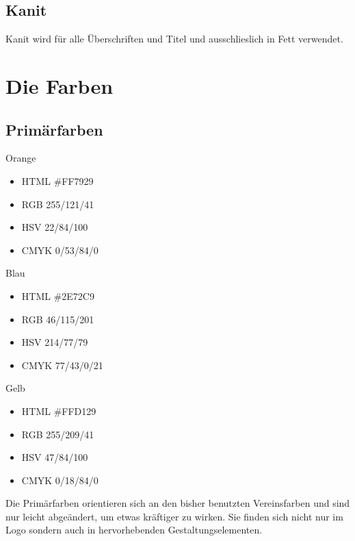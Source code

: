 \documentclass{article}
\begin{document}
\subsection{Kanit}
\begin{samepage}

Kanit wird für alle Überschriften und Titel und ausschlieslich in Fett verwendet.
\end{samepage}

\section{Die Farben}

\subsection{Primärfarben}
\begin{samepage}
\cfield[LESOrange]
Orange
\begin{itemize}
\item HTML \#FF7929
\item RGB 255/121/41
\item HSV 22/84/100
\item CMYK 0/53/84/0
\end{itemize}
\end{samepage}

\begin{samepage}
\cfield[LESBlue]
Blau
\begin{itemize}
\item HTML \#2E72C9
\item RGB 46/115/201
\item HSV 214/77/79
\item CMYK 77/43/0/21
\end{itemize}
\end{samepage}

\begin{samepage}
\cfield[LESYellow]
Gelb
\begin{itemize}
\item HTML \#FFD129
\item RGB 255/209/41
\item HSV 47/84/100
\item CMYK 0/18/84/0
\end{itemize}
\end{samepage}

Die Primärfarben orientieren sich an den bisher benutzten Vereinsfarben und sind nur leicht abgeändert, um etwas kräftiger zu wirken. Sie finden sich nicht nur im Logo sondern auch in hervorhebenden Gestaltungselementen.
\end{document}
